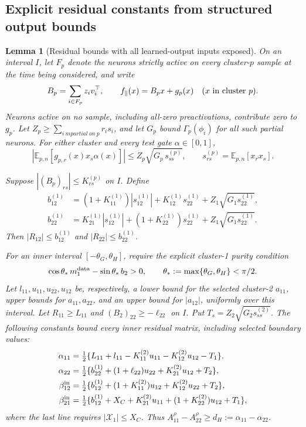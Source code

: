 \documentclass{article} %
\theoremstyle{plain}
\newtheorem{lemma}[theorem]{Lemma}
\theoremstyle{definition}
\theoremstyle{remark}
\begin{document}
\subsection{Explicit residual constants from structured output bounds}
\begin{lemma}[Residual bounds with all learned-output inputs exposed]
\label{sbnew:residual-constants}
On an interval $I$, let $F_p$ denote the neurons strictly active on every
cluster-$p$ sample at the time being considered, and write
\[
 B_p=\sum_{i\in F_p}z_i v_i^\top,\qquad
 f_\parallel(x)=B_px+g_p(x)\quad(x\hbox{ in cluster }p).
\]
Neurons active on no sample, including all-zero preactivations, contribute
zero to $g_p$. Let $Z_p\ge\sum_{i\ {
m partial\ on}\ p}r_is_i$, and let
$G_p$ bound $\Gamma_p(\phi_i)$ for all such partial neurons. For either
cluster and every test gate $\alpha\in[0,1]$,
\begin{equation}\label{sbnew:tail}
 |\mathbb E_{p,n}[g_{p,r}(x)x_s\alpha(x)]|
 \le Z_p\sqrt{G_p\,s_{ss}^{(p)}},
 \qquad s_{rs}^{(p)}=\mathbb E_{p,n}[x_rx_s].
\end{equation}

Suppose $|(B_p)_{rs}|\le K_{rs}^{(p)}$ on $I$.
Define
\begin{align*}
 b_{12}^{(1)}&=(1+K_{11}^{(1)})|s_{12}^{(1)}|
 +K_{12}^{(1)}s_{22}^{(1)}+Z_1\sqrt{G_1s_{22}^{(1)}},\\
 b_{22}^{(1)}&=K_{21}^{(1)}|s_{12}^{(1)}|
 +(1+K_{22}^{(1)})s_{22}^{(1)}+Z_1\sqrt{G_1s_{22}^{(1)}}.
\end{align*}
Then $|R_{12}|\le b_{12}^{(1)}$ and $|R_{22}|\le b_{22}^{(1)}$.

For an inner interval $[-\theta_G,\theta_H]$, require the explicit
cluster-1 purity condition
\begin{equation}\label{sbnew:inner-purity}
 \cos\theta_*\,m_1^{\rm data}-\sin\theta_*\,b_2>0,
 \qquad\theta_*:=\max\{\theta_G,\theta_H\}<\pi/2.
\end{equation}
Let $l_{11},u_{11},u_{22},u_{12}$ be, respectively, a lower bound for
the selected cluster-2 $a_{11}$, upper bounds for $a_{11},a_{22}$, and
an upper bound for $|a_{12}|$, uniformly over this interval.
Let $R_{11}\ge L_{11}$ and $(B_2)_{22}\ge-\ell_{22}$ on $I$.
Put $T_s=Z_2\sqrt{G_2s_{ss}^{(2)}}$. The following constants bound
every inner residual matrix, including selected boundary values:
\begin{align}
 \alpha_{11}&=\tfrac12\{L_{11}+l_{11}
       -K_{11}^{(2)}u_{11}-K_{12}^{(2)}u_{12}-T_1\},\label{sbnew:alpha11}\\
 \alpha_{22}&=\tfrac12\{b_{22}^{(1)}+(1+\ell_{22})u_{22}
       +K_{21}^{(2)}u_{12}+T_2\},\label{sbnew:alpha22}\\
 \beta_{12}^{\rm in}&=\tfrac12\{b_{12}^{(1)}
       +(1+K_{11}^{(2)})u_{12}+K_{12}^{(2)}u_{22}+T_2\},\label{sbnew:beta12}\\
 \beta_{21}^{\rm in}&=\tfrac12\{b_{12}^{(1)}+X_C
       +K_{21}^{(2)}u_{11}+(1+K_{22}^{(2)})u_{12}+T_1\},\label{sbnew:beta21}
\end{align}
where the last line requires $|\mathcal X_1|\le X_C$.
Thus $A_{11}^\rho-A_{22}^\rho\ge d_H:=\alpha_{11}-\alpha_{22}$.
\end{lemma}
\end{document}
